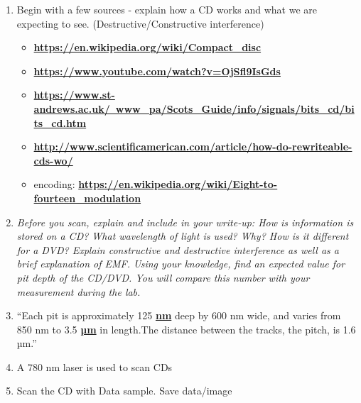 \documentclass{../lab}
\begin{document}
\begin{enumerate}
    \item Begin with a few sources - explain how a CD works and what we are expecting to see. (Destructive/Constructive interference)

    \begin{itemize}
        \item \href{https://en.wikipedia.org/wiki/Compact\_disc}{\textbf{https://en.wikipedia.org/wiki/Compact\_disc}}

        \item \href{https://www.youtube.com/watch?v=OjSfl9IsGds}{\textbf{https://www.youtube.com/watch?v=OjSfl9IsGds}}

        \item ​\href{https://www.st-andrews.ac.uk/~www\_pa/Scots\_Guide/info/signals/bits\_cd/bits\_cd.htm}{\textbf{https://www.st-andrews.ac.uk/~www\_pa/Scots\_Guide/info/signals/bits\_cd/bits\_cd.htm}}

        \item \href{http://www.scientificamerican.com/article/how-do-rewriteable-cds-wo/}{\textbf{http://www.scientificamerican.com/article/how-do-rewriteable-cds-wo/}}

        \item encoding: \href{https://en.wikipedia.org/wiki/Eight-to-fourteen\_modulation}{\textbf{https://en.wikipedia.org/wiki/Eight-to-fourteen\_modulation}}

    \end{itemize}

    \item \emph{Before you scan, explain and include in your write-up: How is information is stored on a CD? What wavelength of light is used? Why? How is it different for a DVD? Explain constructive and destructive interference as well as a brief explanation of EMF. Using your knowledge, find an expected value for pit depth of the CD/DVD. You will compare this number with your measurement during the lab. }

    \item ``Each pit is approximately 125 \href{https://en.wikipedia.org/wiki/Nanometre}{\textbf{nm}} deep by 600 nm wide, and varies from 850 nm to 3.5 \href{https://en.wikipedia.org/wiki/Micrometre}{\textbf{µm}} in length.The distance between the tracks, the pitch, is 1.6 µm.''

    \item A 780 nm laser is used to scan CDs

    \item Scan the CD with Data sample. Save data/image


\end{enumerate}
\end{document}

